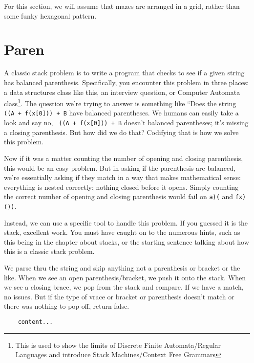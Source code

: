 For this section, we will assume that mazes are arranged in a grid, rather than some funky hexagonal pattern.




\section{Paren}

A classic stack problem is to write a program that checks to see if a given string has balanced parenthesis.  Specifically, you encounter this problem in three places: a data structures class like this, an interview question, or Computer Automata class\footnote{This is used to show the limits of Discrete Finite Automata/Regular Languages and introduce Stack Machines/Context Free Grammars}.
The  question we're trying to answer is something like ``Does the string \texttt{ ((A + f(x[0])) + B} have balanced parentheses.  We humans can easily take a look and say no, \texttt{ ((A + f(x[0])) + B} doesn't balanced parentheses; it's missing a closing parenthesis.  But how did we do that?  Codifying that is how we solve this problem.  

Now if it was a matter counting the number of opening and closing parenthesis, this would be an easy problem.  But in asking if the parenthesis are balanced, we're essentially asking if they match in a way that makes mathematical sense: everything is nested correctly; nothing closed before it opens. Simply counting the correct number of opening and closing parenthesis would fail on \texttt{a)(} and \texttt{fx)())}.

Instead, we can use a specific tool to handle this problem.  If you guessed it is the stack, excellent work.  You must have caught on to the numerous hints, such as this being in the chapter about stacks, or the starting sentence talking about how this is a classic stack problem.

We parse thru the string and skip anything not a parenthesis or bracket or the like.  When we see an open parenthesis/bracket, we push it onto the stack.  When we see a closing brace, we pop from the stack and compare. If we have a match, no issues.  But if the type of vrace or bracket or parenthesis doesn't match or there was nothing to pop off, return false.



\begin{verbatim}
	content...
\end{verbatim}


